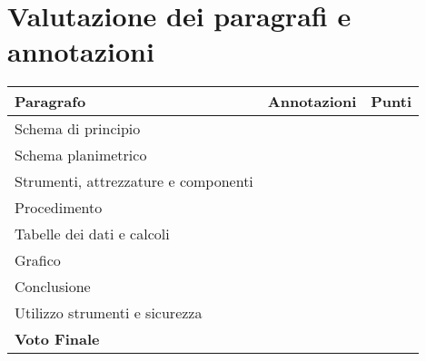 \section*{Valutazione dei paragrafi e annotazioni}

\renewcommand{\arraystretch}{4} %
\begin{tabular}{|p{3.8cm}|p{9cm}|p{1.5cm}|}
\hline
\textbf{Paragrafo} & \textbf{Annotazioni} & \textbf{Punti}\\ \hline
Schema di principio & & \\ \hline
Schema planimetrico & &\\ \hline
Strumenti, attrezzature e componenti & &\\ \hline
Procedimento & &\\ \hline
Tabelle dei dati e calcoli & &\\ \hline
Grafico & &\\ \hline
Conclusione & &\\ \hline
Utilizzo strumenti e sicurezza & &\\ \hline
\textbf{Voto Finale} & &\\ \hline
\end{tabular}
